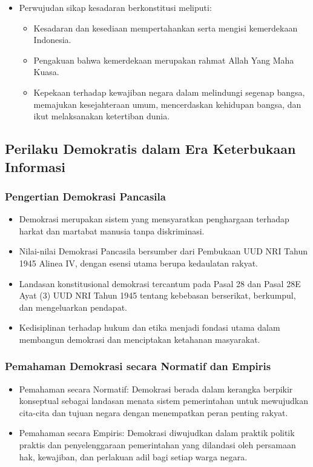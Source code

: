 \begin{itemize}
\begin{itemize}
  \item Hak: Beragama dan beribadah sesuai agama dan kepercayaannya.
  \item Kewajiban: Menjaga kerukunan antarumat beragama dan tidak memaksakan agama atau kepercayaan kepada orang lain.
  \end{itemize}
\item Perwujudan sikap kesadaran berkonstitusi meliputi:
  \begin{itemize}
  \item Kesadaran dan kesediaan mempertahankan serta mengisi kemerdekaan Indonesia.
  \item Pengakuan bahwa kemerdekaan merupakan rahmat Allah Yang Maha Kuasa.
  \item Kepekaan terhadap kewajiban negara dalam melindungi segenap bangsa, memajukan kesejahteraan umum, mencerdaskan kehidupan bangsa, dan ikut melaksanakan ketertiban dunia.
  \end{itemize}
\end{itemize}

\subsection{Perilaku Demokratis dalam Era Keterbukaan Informasi}

\subsubsection{Pengertian Demokrasi Pancasila}
\begin{itemize}
\item Demokrasi merupakan sistem yang mensyaratkan penghargaan terhadap harkat dan martabat manusia tanpa diskriminasi.
\item Nilai-nilai Demokrasi Pancasila bersumber dari Pembukaan UUD NRI Tahun 1945 Alinea IV, dengan esensi utama berupa kedaulatan rakyat.
\item Landasan konstitusional demokrasi tercantum pada Pasal 28 dan Pasal 28E Ayat (3) UUD NRI Tahun 1945 tentang kebebasan berserikat, berkumpul, dan mengeluarkan pendapat.
\item Kedisiplinan terhadap hukum dan etika menjadi fondasi utama dalam membangun demokrasi dan menciptakan ketahanan masyarakat.
\end{itemize}

\subsubsection{Pemahaman Demokrasi secara Normatif dan Empiris}
\begin{itemize}
\item Pemahaman secara Normatif: Demokrasi berada dalam kerangka berpikir konseptual sebagai landasan menata sistem pemerintahan untuk mewujudkan cita-cita dan tujuan negara dengan menempatkan peran penting rakyat.
\item Pemahaman secara Empiris: Demokrasi diwujudkan dalam praktik politik praktis dan penyelenggaraan pemerintahan yang dilandasi oleh persamaan hak, kewajiban, dan perlakuan adil bagi setiap warga negara.
\end{itemize}

